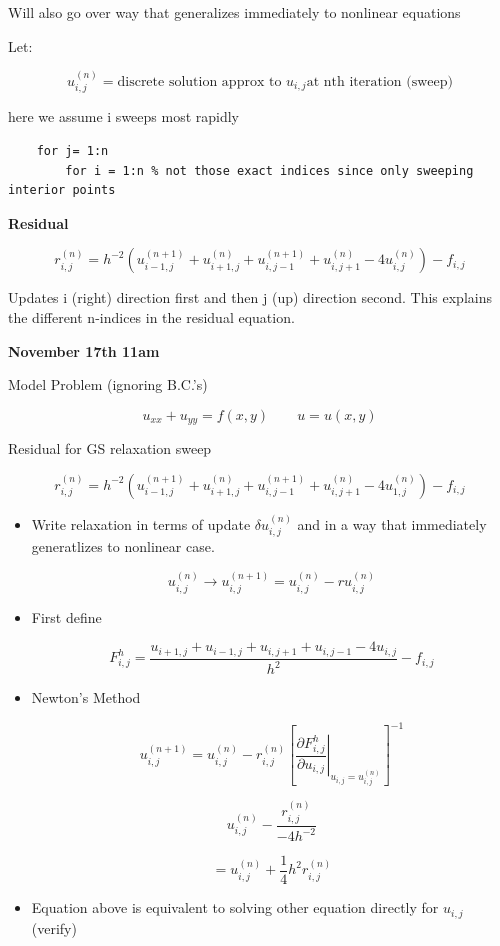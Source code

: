 Will also go over way that generalizes immediately to nonlinear equations

Let:

\[ u_{i,j}^{(n)} = \text{discrete solution approx to } u_{i,j} \text{at nth iteration (sweep)} \]

here we assume i sweeps most rapidly

\begin{verbatim}
    for j= 1:n
        for i = 1:n % not those exact indices since only sweeping interior points
\end{verbatim}

\textbf{Residual}

\[ r_{i,j}^{(n)} = h^{-2}(u_{i-1,j}^{(n+1)} + u_{i+1,j}^{(n)} + u_{i,j-1}^{(n+1)}+u_{i,j+1}^{(n)}-4u_{i,j}^{(n)})-f_{i,j}\]

Updates i (right) direction first and then j (up) direction second. This explains the different n-indices in the residual equation.

\textbf{November 17th 11am}

Model Problem (ignoring B.C.'s)

\[ u_{xx} + u_{yy} = f(x,y) \qquad u = u(x,y)\]

Residual for GS relaxation sweep

\[ r_{i,j}^(n) = h^{-2}(u_{i-1,j}^{(n+1)} + u_{i+1,j}^{(n)} + u_{i,j-1}^{(n+1)}+u_{i,j+1}^{(n)}-4u_{1,j}^{(n)})-f_{i,j}\]


\begin{itemize}
    \item Write relaxation in terms of update $\delta u_{i,j}^{(n)}$ and in a way that immediately generatlizes to nonlinear case.

    \[ u_{i,j}^{(n)} \rightarrow u_{i,j}^{(n+1)} = u_{i,j}^{(n)} - r u_{i,j}^{(n)}\]

    \item First define 

    \[ F_{i,j}^h = \frac{u_{i+1,j} + u_{i-1,j}+u_{i,j+1}+u_{i,j-1}-4u_{i,j}}{h^2}-f_{i,j}\]

    \item Newton's Method 

    \[ u_{i,j}^{(n+1)} = u_{i,j}^{(n)} - r_{i,j}^{(n)} \left[ \left. \frac{\partial F_{i,j}^h}{\partial u_{i,j}} \right|_{u_{i,j} = u_{i,j}^{(n)}} \right]^{-1}\]

    \[ u_{i,j}^{(n)} - \frac{r_{i,j}^{(n)}}{-4h^{-2}}\]

    \[ = u_{i,j}^{(n)} + \frac{1}{4} h^2 r_{i,j}^{(n)}\]

    \item Equation above is equivalent to solving other equation directly for $u_{i,j}$ (verify)
\end{itemize}

